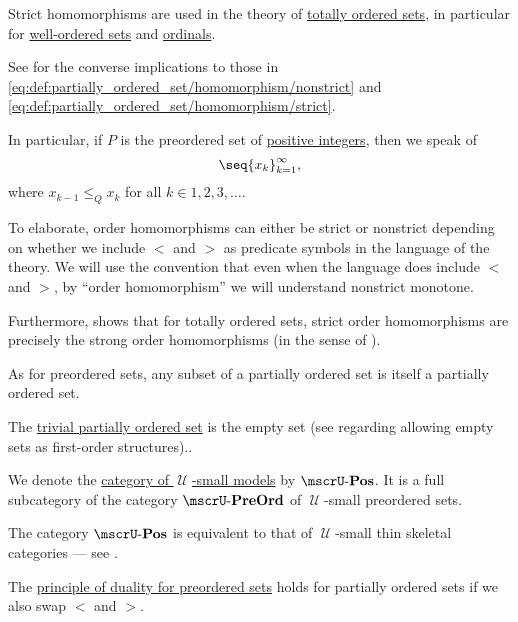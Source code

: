 \begin{definition}
\begin{thmenum}[resume=def:partially_ordered_set]
    Strict homomorphisms are used in the theory of \hyperref[subsec:partially_ordered_sets]{totally ordered sets}, in particular for \hyperref[subsec:well_ordered_sets]{well-ordered sets} and \hyperref[subsec:ordinals]{ordinals}.

    See  for the converse implications to those in \eqref{eq:def:partially_ordered_set/homomorphism/nonstrict} and \eqref{eq:def:partially_ordered_set/homomorphism/strict}.

    In particular, if \( P \) is the preordered set of \hyperref[rem:peano_arithmetic_zero/nonnegative]{positive integers}, then we speak of 
    \begin{equation}\label{eq:def:partially_ordered_set/homomorphism/sequence}
      \seq{ x_k }_{k=1}^\infty,
    \end{equation}
    where \( x_{k-1} \leq_Q x_k \) for all \( k \in 1, 2, 3, \ldots \).

    To elaborate, order homomorphisms can either be strict or nonstrict depending on whether we include \( < \) and \( > \) as predicate symbols in the language of the theory. We will use the convention that even when the language does include \( < \) and \( > \), by \enquote{order homomorphism} we will understand nonstrict monotone.

    Furthermore,  shows that for totally ordered sets, strict order homomorphisms are precisely the strong order homomorphisms (in the sense of ).

     As for preordered sets, any subset of a partially ordered set is itself a partially ordered set.

     The \hyperref[thm:substructures_form_complete_lattice/bottom]{trivial partially ordered set} is the empty set (see  regarding allowing empty sets as first-order structures)..

     We denote the \hyperref[def:category_of_small_first_order_models]{category of \( \mscrU \)-small models} by \( \ucat{Pos} \). It is a full subcategory of the category \hyperref[def:preordered_set/category]{\( \ucat{PreOrd} \)} of \( \mscrU \)-small preordered sets.

    The category \( \ucat{Pos} \) is equivalent to that of \( \mscrU \)-small thin skeletal categories --- see .

     The \hyperref[def:preordered_set/opposite]{principle of duality for preordered sets} holds for partially ordered sets if we also swap \( < \) and \( > \).
  \end{thmenum}
\end{definition}
